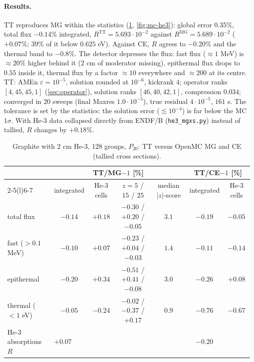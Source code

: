 \documentclass[11pt,a4paper]{article}
\newcommand{\code}[1]{\texttt{#1}}
\begin{document}
\paragraph{Results.} TT reproduces MG within the statistics (\cref{tab:mc-he3}, \cref{fig:mc-he3}): global error $0.35\%$, total flux $-0.14\%$ integrated, $R^{\mathrm{TT}}=5.693\cdot10^{-2}$ against $R^{\mathrm{MG}}=5.689\cdot10^{-2}$ ($+0.07\%$; $39\%$ of it below $0.625$ eV). Against CE, $R$ agrees to $-0.20\%$ and the thermal band to $-0.8\%$. The detector depresses the flux: fast flux ($\approx1$ MeV) is $\approx20\%$ higher behind it (2 cm of moderator missing), epithermal flux drops to $0.55$ inside it, thermal flux by a factor $\approx10$ everywhere and $\approx200$ at its centre. TT: AMEn $\varepsilon=10^{-5}$, solution rounded at $10^{-6}$, kickrank 4; operator ranks $[4,45,45,1]$ (\cref{sec:operator}), solution ranks $[46,40,42,1]$, compression $0.034$; converged in 20 sweeps (final Maxres $1.0\cdot10^{-5}$), true residual $4\cdot10^{-5}$, $161$ s. The tolerance is set by the statistics: the solution error ($\lesssim10^{-4}$) is far below the MC $1\sigma$. With He-3 data collapsed directly from ENDF/B (\code{he3\_mgxs.py}) instead of tallied, $R$ changes by $+0.18\%$.

\begin{table}[ht]
\centering\small
\setlength{\tabcolsep}{3pt}
\begin{tabular}{@{}lcccccc@{}}
\toprule
 & \multicolumn{4}{c}{TT/MG$-1$ [\%]} & \multicolumn{2}{c}{TT/CE$-1$ [\%]} \\
\cmidrule(lr){2-5}\cmidrule(l){6-7}
 & integrated & He-3 cells & $z=5$ / $15$ / $25$ & median $|z|$-score & integrated & He-3 cells \\
\midrule
total flux & $-0.14$ & $+0.18$ & $-0.30$ / $+0.20$ / $-0.05$ & $3.1$ & $-0.19$ & $-0.05$ \\
fast ($>0.1$ MeV) & $-0.10$ & $+0.07$ & $-0.23$ / $+0.04$ / $-0.03$ & $1.4$ & $-0.11$ & $-0.14$ \\
epithermal & $-0.20$ & $+0.34$ & $-0.51$ / $+0.41$ / $-0.08$ & $3.0$ & $-0.26$ & $+0.08$ \\
thermal ($<1$ eV) & $-0.05$ & $-0.24$ & $-0.02$ / $-0.37$ / $+0.17$ & $0.9$ & $-0.76$ & $-0.67$ \\
He-3 absorptions $R$ & \multicolumn{4}{l}{$+0.07$} & $-0.20$ & \\
\bottomrule
\end{tabular}
\caption{Graphite with 2 cm He-3, 128 groups, $P_{20}$: TT versus OpenMC MG and CE (tallied cross sections).}
\label{tab:mc-he3}
\end{table}
\end{document}
